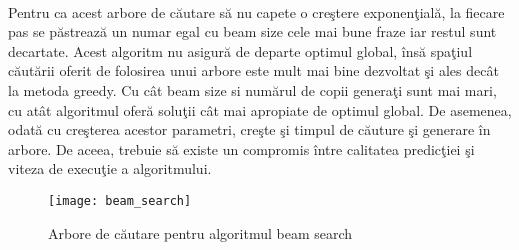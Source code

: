 \paragraph{}
Pentru ca acest arbore de c\u autare s\u a nu capete o cre\c stere exponen\c tial\u a, la fiecare pas se p\u astreaz\u a un numar egal cu beam size cele mai bune fraze iar restul sunt decartate. Acest algoritm nu asigur\u a de departe optimul global, \^ ins\u a spa\c tiul c\u aut\u arii oferit de folosirea unui arbore este mult mai bine dezvoltat \c si ales dec\^ at la metoda greedy. Cu c\^ at beam size si num\u arul de copii genera\c ti sunt mai mari, cu at\^ at algoritmul ofer\u a solu\c tii c\^ at mai apropiate de optimul global. De asemenea, odat\u a cu cre\c sterea acestor parametri, cre\c ste \c si timpul de c\u auture \c si generare \^ in arbore. De aceea, trebuie s\u a existe un compromis \^ intre calitatea predic\c tiei \c si viteza de execu\c tie a algoritmului.

\begin{figure}[H]
\centering
\texttt{[image: beam\_search]}
\caption{Arbore de c\u autare pentru algoritmul beam search}
\end{figure} 